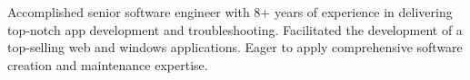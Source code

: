 \documentclass[letter,10pt]{article}
\begin{document}


Accomplished senior software engineer with 8+ years of experience in delivering top-notch app development and troubleshooting.
Facilitated the development of a top-selling web and windows applications. Eager to apply comprehensive software creation and
maintenance expertise.
\end{document}
